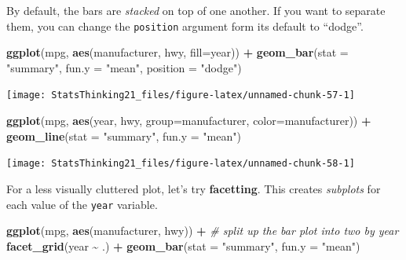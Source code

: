 \documentclass[
  12pt,
]{book}
\newenvironment{Shaded}{\begin{snugshade}}{\end{snugshade}}
\newcommand{\AttributeTok}[1]{\textcolor[rgb]{0.13,0.29,0.53}{#1}}
\newcommand{\CommentTok}[1]{\textcolor[rgb]{0.56,0.35,0.01}{\textit{#1}}}
\newcommand{\FunctionTok}[1]{\textcolor[rgb]{0.13,0.29,0.53}{\textbf{#1}}}
\newcommand{\NormalTok}[1]{#1}
\newcommand{\SpecialCharTok}[1]{\textcolor[rgb]{0.81,0.36,0.00}{\textbf{#1}}}
\newcommand{\StringTok}[1]{\textcolor[rgb]{0.31,0.60,0.02}{#1}}
\begin{document}
By default, the bars are \emph{stacked} on top of one another. If you want to separate them, you can change the \texttt{position} argument form its default to ``dodge''.

\begin{Shaded}
\begin{Highlighting}[]
\FunctionTok{ggplot}\NormalTok{(mpg, }\FunctionTok{aes}\NormalTok{(manufacturer, hwy, }\AttributeTok{fill=}\NormalTok{year)) }\SpecialCharTok{+}
  \FunctionTok{geom\_bar}\NormalTok{(}\AttributeTok{stat =} \StringTok{"summary"}\NormalTok{, }
           \AttributeTok{fun.y =} \StringTok{"mean"}\NormalTok{, }
           \AttributeTok{position =} \StringTok{"dodge"}\NormalTok{)}
\end{Highlighting}
\end{Shaded}

\texttt{[image: StatsThinking21\_files/figure-latex/unnamed-chunk-57-1]}

\begin{Shaded}
\begin{Highlighting}[]
\FunctionTok{ggplot}\NormalTok{(mpg, }\FunctionTok{aes}\NormalTok{(year, hwy, }
                \AttributeTok{group=}\NormalTok{manufacturer,}
                \AttributeTok{color=}\NormalTok{manufacturer)) }\SpecialCharTok{+}
  \FunctionTok{geom\_line}\NormalTok{(}\AttributeTok{stat =} \StringTok{"summary"}\NormalTok{, }\AttributeTok{fun.y =} \StringTok{"mean"}\NormalTok{)}
\end{Highlighting}
\end{Shaded}

\texttt{[image: StatsThinking21\_files/figure-latex/unnamed-chunk-58-1]}

For a less visually cluttered plot, let's try \textbf{facetting}. This creates \emph{subplots} for each value of the \texttt{year} variable.

\begin{Shaded}
\begin{Highlighting}[]
\FunctionTok{ggplot}\NormalTok{(mpg, }\FunctionTok{aes}\NormalTok{(manufacturer, hwy)) }\SpecialCharTok{+}
  \CommentTok{\# split up the bar plot into two by year}
  \FunctionTok{facet\_grid}\NormalTok{(year }\SpecialCharTok{\textasciitilde{}}\NormalTok{ .) }\SpecialCharTok{+} 
  \FunctionTok{geom\_bar}\NormalTok{(}\AttributeTok{stat =} \StringTok{"summary"}\NormalTok{, }
           \AttributeTok{fun.y =} \StringTok{"mean"}\NormalTok{)}
\end{Highlighting}
\end{Shaded}
\end{document}

